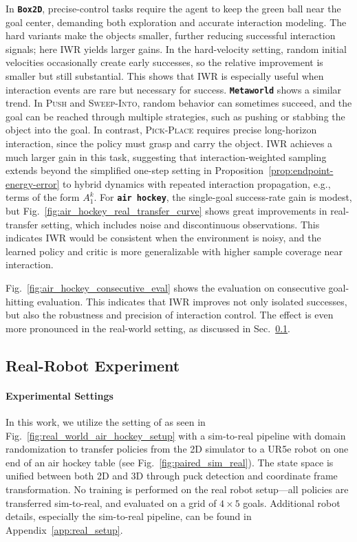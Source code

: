 In \texttt{\textbf{Box2D}}, precise-control tasks require the agent to keep the green ball near the goal center, demanding both exploration and accurate interaction modeling. The hard variants make the objects smaller, further reducing successful interaction signals; here IWR yields larger gains. In the hard-velocity setting, random initial velocities occasionally create early successes, so the relative improvement is smaller but still substantial. This shows that IWR is especially useful when interaction events are rare but necessary for success.
\texttt{\textbf{Metaworld}} shows a similar trend. In \textsc{Push} and \textsc{Sweep-Into}, random behavior can sometimes succeed, and the goal can be reached through multiple strategies, such as pushing or stabbing the object into the goal. In contrast, \textsc{Pick-Place} requires precise long-horizon interaction, since the policy must grasp and carry the object. IWR achieves a much larger gain in this task, suggesting that interaction-weighted sampling extends beyond the simplified one-step setting in Proposition~\ref{prop:endpoint-energy-error} to hybrid dynamics with repeated interaction propagation, e.g., terms of the form $A_1^k$.
For \texttt{\textbf{air hockey}}, the single-goal success-rate gain is modest, but Fig.~\ref{fig:air_hockey_real_transfer_curve} shows great improvements in real-transfer setting, which includes noise and discontinuous observations. This indicates IWR would be consistent when the environment is noisy, and the learned policy and critic is more generalizable with higher sample coverage near interaction.

Fig.~\ref{fig:air_hockey_consecutive_eval} shows the evaluation on consecutive goal-hitting evaluation. This indicates that IWR improves not only isolated successes, but also the robustness and precision of interaction control. The effect is even more pronounced in the real-world setting, as discussed in Sec.~\ref{subsec:real-robot}.


% 
\subsection{Real-Robot Experiment}
\label{subsec:real-robot}
\paragraph{Experimental Settings} In this work, we utilize the setting of \citet{chuck2024robot} as seen in Fig.~\ref{fig:real_world_air_hockey_setup} with a sim-to-real pipeline with domain randomization to transfer policies from the 2D simulator to a UR5e robot on one end of an air hockey table (see Fig.~\ref{fig:paired_sim_real}). The state space is unified between both 2D and 3D through puck detection and coordinate frame transformation. No training is performed on the real robot setup---all policies are transferred sim-to-real, and evaluated on a grid of $4\times5$ goals. Additional robot details, especially the sim-to-real pipeline, can be found in Appendix~\ref{app:real_setup}.
\vspace{-0.8em}
